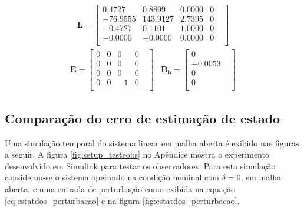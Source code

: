 \begin{equation}\label{ed:UIO:L}
    \begin{split}
        \mathbf{L} =
        \begin{bmatrix}
              0.4727& 0.8899& 0.0000& 0&\\
            -76.9555& 143.9127& 2.7395& 0&\\
             -0.4727& 0.1101& 1.0000& 0&\\
             -0.0000& -0.0000& 0.0000& 0&\\
        \end{bmatrix}
    \end{split}
\end{equation}
\begin{equation*}\label{ed:UIO:E_Bh}
    \begin{split}
        \mathbf{E} =
        \begin{bmatrix}
            0& 0& 0& 0&\\
            0& 0& 0& 0&\\
            0& 0& 0& 0&\\
            0& 0&-1& 0&\\
        \end{bmatrix}
    \end{split}
    \begin{split}
        \mathbf{B_h} =
        \begin{bmatrix}
            0&\\
            -0.0053&\\
            0&\\
            0&\\
        \end{bmatrix}
    \end{split}
\end{equation*}

\subsection{Comparação do erro de estimação de estado}

Uma simulação temporal do sistema linear em malha aberta é exibido nas figuras a seguir. A figura \ref{fig:setup_testeobs} no Apêndice mostra o experimento desenvolvido em Simulink para testar os observadores.
Para esta simulação considerou-se o sistema operando na condição nominal com $\delta=0$, em malha aberta, e uma entrada de perturbação como exibida na equação \eqref{eq:estatdos_perturbacao} e na figura \ref{fig:estatdos_perturbacao}.

